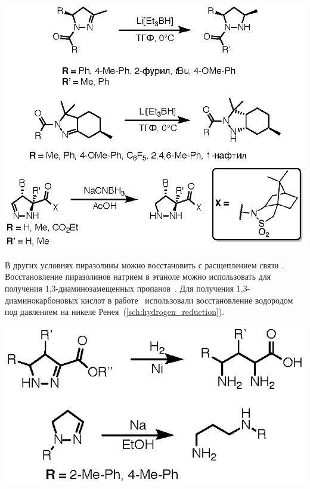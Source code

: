\begin{scheme}[h!]
    \centering
    \includegraphics{sections/literature/img/hydride_reduction.eps}
    \caption{}
    \label{sch:hydride_reduction}
\end{scheme}

В других условиях пиразолины можно восстановить с расщеплением связи .
Восстановление пиразолинов натрием в этаноле можно использовать для получения 1,3-диаминозамещенных пропанов~\cite{Chemistry1967}.
Для получения 1,3-диаминокарбоновых кислот в работе~\cite{Carter1949} использовали восстановление водородом под давлением на никеле Ренея~(\ref{sch:hydrogen_reduction}).

\begin{scheme}[h!]
    \centering
    \includegraphics{sections/literature/img/hydrogen_reduction.eps}
    \caption{}
    \label{sch:hydrogen_reduction}
\end{scheme}

